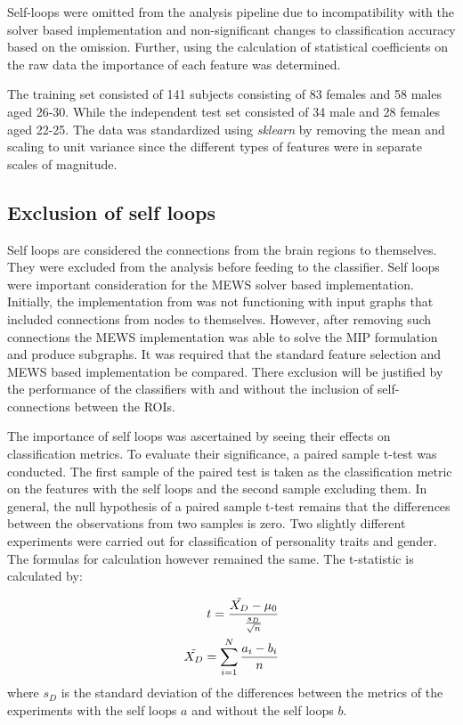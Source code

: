 \documentclass[msthesis.tex]{subfiles}
\begin{document}
Self-loops were omitted from the analysis pipeline due to incompatibility with the solver based implementation and non-significant changes to classification accuracy based on the omission. Further, using the calculation of statistical coefficients on the raw data the importance of each feature was determined. 

The training set consisted of 141 subjects consisting of 83 females and 58 males aged 26-30. While the independent test set consisted of 34 male and 28 females aged 22-25. The data was standardized using \textit{sklearn} by removing the mean and scaling to unit variance since the different types of features were in separate scales of magnitude.


\subsection{Exclusion of self loops}
\label{sec:exclusion}
Self loops are considered the connections from the brain regions to themselves. They were excluded from the analysis before feeding to the classifier. Self loops were important consideration for the MEWS solver based implementation. Initially, the implementation from \cite{DBLP:journals/corr/LobodaAS16} was not functioning with input graphs that included connections from nodes to themselves. However, after removing such connections the MEWS implementation was able to solve the MIP formulation and produce subgraphs. It was required that the standard feature selection and MEWS based implementation be compared. There exclusion will be justified by the performance of the classifiers with and without the inclusion of self-connections between the ROIs. 

The importance of self loops was ascertained by seeing their effects on classification metrics. To evaluate their significance, a paired sample t-test was conducted. The first sample of the paired test is taken as the classification metric on the features with the self loops and the second sample excluding them. In general, the null hypothesis of a paired sample t-test remains that the differences between the observations from two samples is zero. Two slightly different experiments were carried out for classification of personality traits and gender. The formulas for calculation however remained the same. The t-statistic is calculated by:


\begin{align}
    \label{eq:pairedtest}
    t = \frac{\Tilde{X_{D}} - \mu_0}{\frac{s_{D}}{\sqrt{n}}} \\
    \Tilde{X_D} = \sum_{i=1}^{N} \frac{a_{i} - b_{i}}{n}
\end{align}where $s_D$ is the standard deviation of the differences between the metrics of the experiments with the self loops $a$ and without the self loops $b$. 
\end{document}
